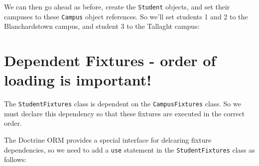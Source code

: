 \documentclass[a4paperpaper,openright]{book}
\newenvironment{Shaded}{}{}
\newcommand{\CommentTok}[1]{\textcolor[rgb]{0.38,0.63,0.69}{\textit{#1}}}
\newcommand{\KeywordTok}[1]{\textcolor[rgb]{0.00,0.44,0.13}{\textbf{#1}}}
\newcommand{\NormalTok}[1]{#1}
\newcommand{\OtherTok}[1]{\textcolor[rgb]{0.00,0.44,0.13}{#1}}
\newcommand{\StringTok}[1]{\textcolor[rgb]{0.25,0.44,0.63}{#1}}
\begin{document}
We can then go ahead as before, create the \texttt{Student} objects, and
set their campuses to these \texttt{Campus} object references. So we'll
set students 1 and 2 to the Blanchardstown campus, and student 3 to the
Tallaght campus:

\begin{Shaded}
\end{Shaded}

\hypertarget{dependent-fixtures---order-of-loading-is-important}{%
\section{Dependent Fixtures - order of loading is
important!}\label{dependent-fixtures---order-of-loading-is-important}}

The \texttt{StudentFixtures} class is dependent on the
\texttt{CampusFixtures} class. So we must declare this dependency so
that these fixtures are executed in the correct order.

The Doctrine ORM provides a special interface for delcaring fixture
dependencies, so we need to add a \texttt{use} statement in the
\texttt{StudentFixtures} class as follows:
\end{document}
